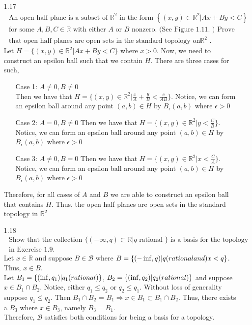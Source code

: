 \documentclass[12pt]{article}
\newcommand{\R}{\mathds{R}}
\newcommand{\B}{\mathcal{B}}
\begin{document}
\begin{enumerate}
	\item[1.17] $ \begin{array} { l } { \text { An open half plane is a subset of } \mathbb { R } ^ { 2 } \text { in the form } \left\{ ( x , y ) \in \mathbb { R } ^ { 2 } | A x + B y < C \right\} } \\ { \text { for some } A , B , C \in \mathbb { R } \text { with either } A \text { or } B \text { nonzero. (See Figure } 1.11 . \text { ) Prove } } \\ { \text { that open half planes are open sets in the standard topology on} \mathbb { R }^2 \text { . } } \end{array} $\\
	Let $ H = \{(x,y)\in\R^2|Ax+By<C\} $ where $ x>0 $. Now, we need to construct an epsilon ball such that we contain $ H $. There are three cases for such,
	\begin{enumerate}
		\item[Case 1:] $ A \not= 0, B\not= 0 $\\
			Then we have that $ H = \{(x,y)\in\R^2|\frac{x}{A}+\frac{y}{B}<\frac{c}{AB}\} $. Notice, we can form an epsilon ball around any point $ (a,b)\in H $ by $ B_\epsilon (a,b) $ where $ \epsilon > 0 $  
		\item[Case 2:] $ A = 0, B \not= 0 $
			Then we have that $ H = \{(x,y)\in\R^2|y <\frac{C}{B}\} $. Notice, we can form an epsilon ball around any point $ (a,b)\in H $ by $ B_\epsilon (a,b) $ where $ \epsilon > 0 $  
		\item[Case 3:] $ A \not= 0, B = 0 $
			Then we have that $ H = \{(x,y)\in\R^2|x<\frac{C}{A}\} $. Notice, we can form an epsilon ball around any point $ (a,b)\in H $ by $ B_\epsilon (a,b) $ where $ \epsilon > 0 $  
	\end{enumerate}
 	Therefore, for all cases of $ A $ and $ B $ we are able to construct an epsilon ball that contains $ H $. Thus, the open half planes are open sets in the standard topology in $ \R^2 $
	\item[1.18]$ \begin{array} { l } { \text { Show that the collection } \{ ( - \infty , q ) \subset \mathbb { R } | q \text { rational } \} \text { is a basis for the topology } } \\ { \text { in Exercise } 1.9 . } \end{array} $\\
	Let $ x\in\R $ and suppose $ B\in \B $ where $ B = \{(-\inf,q)|q \text( rational and) x<q\}$. Thus, $ x\in B $.\\
	Let $ B_1 = \{(\inf,q_1)|q_1 \text( rational)\} $, $ B_2= \{(\inf,q_2)|q_2 \text( rational)\} $ and suppose $ x\in B_1\cap B_2 $. Notice, either $ q_1\leq q_2 $ or $ q_2 \leq q_1 $. Without loss of generality suppose $ q_1 \leq q_2 $. Then $ B_1\cap B_2 $ = $ B_1  \Rightarrow x\in B_1 \subset B_1\cap B_2$. Thus, there exists a $ B_3 $ where $ x\in B_3 $, namely $ B_3 = B_1 $.\\
	Therefore, $ \B $ satisfies both conditions for being a basis for a topology.
	

\end{enumerate}
\end{document}
